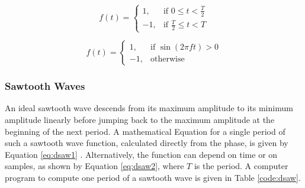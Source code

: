   \begin{multicols}{2}

    \begin{equation}
      f(t) =
      \begin{cases}
        1,& \text{if } 0 \leq t < \frac{T}{2}\\
        -1,& \text{if } \frac{T}{2} \leq t < T
      \end{cases}
      \label{eq:dsquare1}
    \end{equation}

    \begin{equation}
      f(t) =
      \begin{cases}
        1,& \text{if } \sin(2 \pi f t) > 0\\
        -1,& \text{otherwise}
      \end{cases}
      \label{eq:dsquare2}
    \end{equation}

  \end{multicols}

  \begin{table}
  \end{table}

  \subsubsection{Sawtooth Waves}

  An ideal sawtooth wave descends from its maximum amplitude to its minimum amplitude linearly before jumping back to the maximum amplitude at the beginning of the next period. A mathematical Equation for a single period of such a sawtooth wave function, calculated directly from the phase, is given by Equation \ref{eq:dsaw1} . Alternatively, the function can depend on time or on samples, as shown by Equation \ref{eq:dsaw2}, where $T$ is the period. A computer program to compute one period of a sawtooth wave is given in Table \ref{code:dsaw}.

